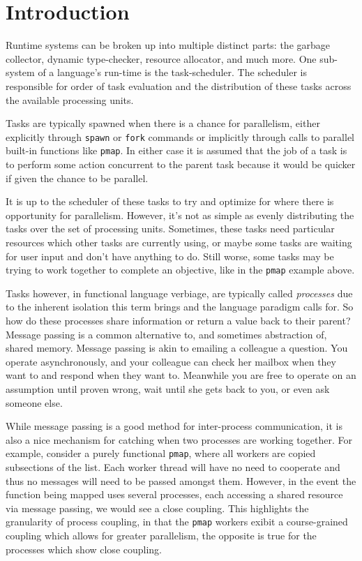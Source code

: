 \chapter{Introduction}
%
\label{chap:introduction}

Runtime systems can be broken up into multiple distinct parts: the garbage 
collector, dynamic type-checker, resource allocator, and much more. One 
sub-system of a language's run-time is the task-scheduler. The scheduler is 
responsible for order of task evaluation and the distribution of 
these tasks across the available processing units.

Tasks are typically spawned when there is a chance for parallelism, either 
explicitly through \texttt{spawn} or \texttt{fork} commands or implicitly 
through calls to parallel built-in functions like \texttt{pmap}. In either 
case it is assumed that the job of a task is to perform some action concurrent 
to the parent task because it would be quicker if given the chance to be 
parallel.

It is up to the scheduler of these tasks to try and optimize for where there
is opportunity for parallelism. However, it's not as simple as evenly 
distributing the tasks over the set of processing units. Sometimes, these 
tasks need particular resources which other tasks are currently using,
or maybe some tasks are waiting for user input and don't have anything to
do. Still worse, some tasks may be trying to work together to complete an 
objective, like in the \texttt{pmap} example above.

Tasks however, in functional language verbiage, are typically called 
{\em processes} due to the inherent isolation this term brings and the language 
paradigm calls for. So how do these processes share information or return a 
value back to their parent? Message passing is a common alternative to, and 
sometimes abstraction of, shared
memory. Message passing is akin to emailing a colleague a question. You operate
asynchronously, and your colleague can check her mailbox when they want to and 
respond when they want to. Meanwhile you are free to operate on an assumption 
until proven wrong, wait until she gets back to you, or even ask someone else.

While message passing is a good method for inter-process communication, it is
also a nice mechanism for catching when two processes are working together.
For example, consider a purely functional \texttt{pmap}, where all 
workers are copied subsections of the list. Each worker thread will have no
need to cooperate and thus no messages will need to be passed amongst them.
However, in the event the function being mapped uses several processes, each 
accessing a shared resource via message passing, we would see a close coupling.
This highlights the granularity of process coupling, in that the \texttt{pmap}
workers exibit a course-grained coupling which allows for greater parallelism,
the opposite is true for the processes which show close coupling.

